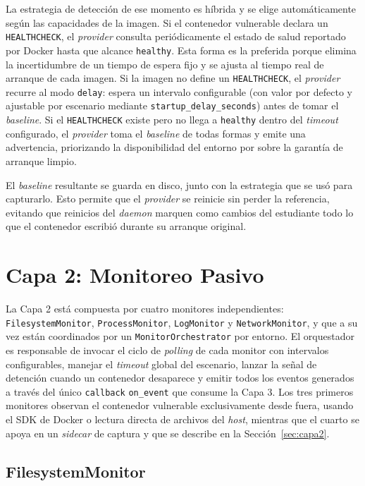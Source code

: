 La estrategia de detección de ese momento es híbrida y se elige automáticamente
según las capacidades de la imagen. Si el contenedor vulnerable declara un
\texttt{HEALTHCHECK}, el \textit{provider} consulta periódicamente el estado de
salud reportado por Docker hasta que alcance \texttt{healthy}. Esta forma es la
preferida porque elimina la incertidumbre de un tiempo de espera fijo y se
ajusta al tiempo real de arranque de cada imagen. Si la imagen no define un
\texttt{HEALTHCHECK}, el \textit{provider} recurre al modo \texttt{delay}:
espera un intervalo configurable (con valor por defecto y ajustable por
escenario mediante \texttt{startup\_delay\_seconds}) antes de tomar el
\textit{baseline}. Si el \texttt{HEALTHCHECK} existe pero no llega a
\texttt{healthy} dentro del \textit{timeout} configurado, el \textit{provider}
toma el \textit{baseline} de todas formas y emite una advertencia, priorizando
la disponibilidad del entorno por sobre la garantía de arranque limpio.

El \textit{baseline} resultante se guarda en disco, junto con la estrategia que
se usó para capturarlo. Esto permite que el \textit{provider} se reinicie sin
perder la referencia, evitando que reinicios del \textit{daemon} marquen como
cambios del estudiante todo lo que el contenedor escribió durante su arranque
original.

\section{Capa 2: Monitoreo Pasivo}

La Capa 2 está compuesta por cuatro monitores independientes:
\texttt{FilesystemMonitor}, \texttt{ProcessMonitor}, \texttt{LogMonitor} y
\texttt{NetworkMonitor}, y que a su vez están coordinados por un
\texttt{MonitorOrchestrator} por entorno. El orquestador es responsable de
invocar el ciclo de \textit{polling} de cada monitor con intervalos
configurables, manejar el \textit{timeout} global del escenario, lanzar la señal
de detención cuando un contenedor desaparece y emitir todos los eventos
generados a través del único \texttt{callback} \texttt{on\_event} que consume la
Capa 3. Los tres primeros monitores observan el contenedor vulnerable
exclusivamente desde fuera, usando el SDK de Docker o lectura directa de
archivos del \textit{host}, mientras que el cuarto se apoya en un
\textit{sidecar} de captura y que se describe en la Sección~\ref{sec:capa2}.

\subsection{FilesystemMonitor}

